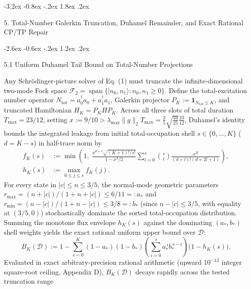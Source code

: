\documentclass[11pt,letterpaper]{article}
\makeatletter
\renewcommand\section{\@startsection{section}{1}{\z@}%
  {-3.2ex \@plus -0.8ex \@minus -.2ex}%
  {1.8ex \@plus .2ex}%
  {\normalfont\Large\bfseries\raggedright\hyphenpenalty=10000}}
\renewcommand\subsection{\@startsection{subsection}{2}{\z@}%
  {-2.6ex \@plus -0.6ex \@minus -.2ex}%
  {1.2ex \@plus .2ex}%
  {\normalfont\large\bfseries\raggedright\hyphenpenalty=10000}}
\theoremstyle{definition}
\makeatother
\begin{document}
\section{5. Total-Number Galerkin Truncation, Duhamel Remainder, and
Exact Rational CP/TP
Repair}\label{total-number-galerkin-truncation-duhamel-remainder-and-exact-rational-cptp-repair}

\subsection{5.1 Uniform Duhamel Tail Bound on Total-Number
Projections}\label{uniform-duhamel-tail-bound-on-total-number-projections}

Any Schrödinger-picture solver of Eq. (1) must truncate the
infinite-dimensional two-mode Fock space
\(\mathcal{F}_2 = \operatorname{span}\{|n_0, n_1\rangle : n_0, n_1 \ge 0\}\).
Define the total-excitation number operator
\(N_{\mathrm{tot}} = a_0^\dagger a_0 + a_1^\dagger a_1\), Galerkin
projector \(P_K := \mathbf{1}_{N_{\mathrm{tot}} \le K}\), and truncated
Hamiltonian \(H_K = P_K H P_K\). Across all three slots of total
duration \(T_{\max} = 23/12\), setting
\(x := 9/10 > \lambda_{\max}\|g\|_2 T_{\max} = \frac{2}{5}\sqrt{\frac{34}{25}}\frac{23}{12}\),
Duhamel's identity
\citep{hornJohnson2012, woods2014, mascherpa2017, tamascelli2018} bounds
the integrated leakage from initial total-occupation shell
\(s \in \{0, \dots, K\}\) (\(d = K - s\)) in half-trace norm by
\[\begin{aligned}
f_K(s) &:= \min\!\left(1,\; \frac{x^{d+1}\sqrt{(K+1)!/s!}}{1 - x^2/2} \sum_{l=0}^{s} \binom{s}{l} \frac{x^{2l}}{(d+l)!(d + 2l + 1)}\right), \\
h_K(s) &:= \max_{0 \le j \le s} f_K(j).
\end{aligned}
\tag{23}\] For every state in \(|c| \le n \le 3/5\), the normal-mode
geometric parameters \(r_{\max} = (n+|c|)/(1+n+|c|) \le 6/11 =: a_*\)
and \(r_{\min} = (n-|c|)/(1+n-|c|) \le 3/8 =: b_*\) (since
\(n - |c| \le 3/5\), with equality at \((3/5, 0)\)) stochastically
dominate the sorted total-occupation distribution. Summing the monotone
flux envelope \(h_K(s)\) against the dominating \((a_*, b_*)\) shell
weights yields the exact rational uniform upper bound over
\(\mathcal{D}\):
\[B_K(\mathcal{D}) := 1 - \sum_{s=0}^{K} (1 - a_*)(1 - b_*)\left(\sum_{i=0}^{s} a_*^{\,i} b_*^{\,s-i}\right)\big(1 - h_K(s)\big).
\tag{24}\] Evaluated in exact arbitrary-precision rational arithmetic
(upward \(10^{-12}\) integer square-root ceiling, Appendix D),
\(B_K(\mathcal{D})\) decays rapidly across the tested truncation range
\end{document}
